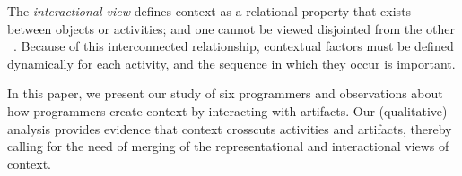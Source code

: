 The \textit{interactional view} defines context as a relational property that exists between objects or activities; and one cannot be viewed disjointed from the other ~\cite{Dourish:2004}. Because of this interconnected relationship, contextual factors must be defined dynamically for each activity, and the sequence in which they occur is important.

In this paper, we present our study of six programmers and observations about how programmers create context by interacting with artifacts. Our (qualitative) analysis provides evidence that context crosscuts activities and artifacts, thereby calling for the need of merging of the representational and interactional views of context.



